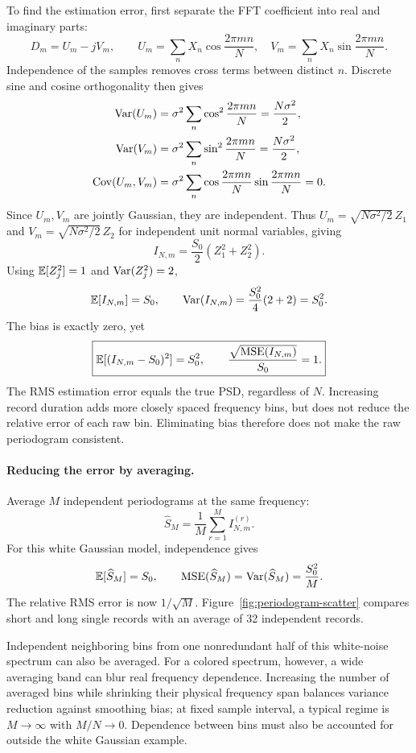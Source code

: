To find the estimation error, first separate the FFT coefficient into real and imaginary parts:
\[
D_m=U_m-jV_m,\qquad
U_m=\sum_nX_n\cos\frac{2\pi mn}{N},\quad
V_m=\sum_nX_n\sin\frac{2\pi mn}{N}.
\]
Independence of the samples removes cross terms between distinct $n$. Discrete sine and cosine orthogonality then gives
\begin{align*}
\operatorname{Var}(U_m)&=\sigma^2\sum_n\cos^2\frac{2\pi mn}{N}=\frac{N\sigma^2}{2},\\
\operatorname{Var}(V_m)&=\sigma^2\sum_n\sin^2\frac{2\pi mn}{N}=\frac{N\sigma^2}{2},\\
\operatorname{Cov}(U_m,V_m)&=\sigma^2\sum_n
\cos\frac{2\pi mn}{N}\sin\frac{2\pi mn}{N}=0.
\end{align*}
Since $U_m,V_m$ are jointly Gaussian, they are independent. Thus
$U_m=\sqrt{N\sigma^2/2}\,Z_1$ and $V_m=\sqrt{N\sigma^2/2}\,Z_2$ for independent unit normal variables, giving
\[
I_{N,m}=\frac{S_0}{2}(Z_1^2+Z_2^2).
\]
Using $\mathbb E[Z_j^2]=1$ and $\operatorname{Var}(Z_j^2)=2$,
\[
\mathbb E[I_{N,m}]=S_0,\qquad
\operatorname{Var}(I_{N,m})=\frac{S_0^2}{4}(2+2)=S_0^2.
\]
The bias is exactly zero, yet
\[
\boxed{\mathbb E[(I_{N,m}-S_0)^2]=S_0^2,\qquad
\frac{\sqrt{\operatorname{MSE}(I_{N,m})}}{S_0}=1.}
\]
The RMS estimation error equals the true PSD, regardless of $N$. Increasing record duration adds more closely spaced frequency bins, but does not reduce the relative error of each raw bin. Eliminating bias therefore does not make the raw periodogram consistent.

\paragraph{Reducing the error by averaging.}
Average $M$ independent periodograms at the same frequency:
\[
\widehat S_M=\frac1M\sum_{r=1}^M I_{N,m}^{(r)}.
\]
For this white Gaussian model, independence gives
\[
\mathbb E[\widehat S_M]=S_0,\qquad
\operatorname{MSE}(\widehat S_M)
=\operatorname{Var}(\widehat S_M)=\frac{S_0^2}{M}.
\]
The relative RMS error is now $1/\sqrt M$. Figure~\ref{fig:periodogram-scatter} compares short and long single records with an average of 32 independent records.
\PeriodogramScatterFigure

Independent neighboring bins from one nonredundant half of this white-noise spectrum can also be averaged. For a colored spectrum, however, a wide averaging band can blur real frequency dependence. Increasing the number of averaged bins while shrinking their physical frequency span balances variance reduction against smoothing bias; at fixed sample interval, a typical regime is $M\to\infty$ with $M/N\to0$. Dependence between bins must also be accounted for outside the white Gaussian example.

